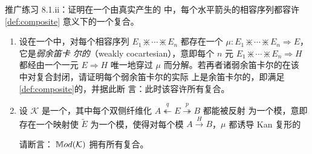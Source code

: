 \begin{exercise}\label{ex:virtual-double-composites}
推广练习 8.1.ii：证明在一个由真实\trDoubleCategory{}产生的%
\trVirtualDoubleCategory{}中，每个水平箭头的相容序列都容许\cref{def:composite}%
意义下的一个复合。
\end{exercise}

\begin{exercise}\label{ex:all-composites}
\begin{enumerate}[label=(\roman*)]
\item 设在一个\trVirtualEquipment{}中，对每个相容序列
$E_{1}\divideontimes\cdots\divideontimes E_{n}$ 都存在一个\trCell{}
$\mu\colon E_{1}\divideontimes\cdots\divideontimes E_{n}\Rightarrow E$，它是\emph{弱余笛卡
尔的}（weakly cocartesian），意即每个 $n$ 元\trCell{}
$E_{1}\divideontimes\cdots\divideontimes E_{n}\Rightarrow H$ 都经由一个一元\trCell{}
$E\Rightarrow H$ 唯一地穿过 $\mu$ 而分解。若再者诸弱余笛卡尔的\trCell{}在该%
\trVirtualDoubleCategory{}中对复合封闭，请证明每个弱余笛卡尔的\trCell{}实际
上是余笛卡尔的，即满足\cref{def:composite}的\trUniversalProperty，并据此断
言：此时该\trVirtualEquipment{}容许所有复合。
\item 设 $\mathcal{K}$ 是一个\trInfinityCosmos，其中每个双侧纤维化
$A\overset{q}{\twoheadleftarrow}E\overset{p}{\twoheadrightarrow}B$ 都能被反射
为一个模，意即存在一个\trSpan{}映射使 $\tilde{E}$ 为一个模，使得对每个模
$A\xrightarrow{H}B$，$\mu$ 都诱导 Kan 复形的\trEquivalence
\begin{center}
\end{center}
请断言：\trVirtualEquipment{} $\mathbb{M}od(\mathcal{K})$ 拥有所有复合。
\end{enumerate}
\end{exercise}

